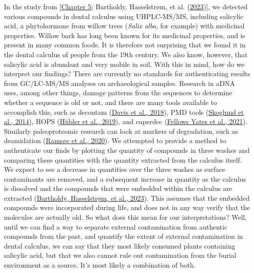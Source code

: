 \documentclass[
  letterpaper,
]{book}
\begin{document}
In the study from {[}\protect\hyperlink{mb11CalculusPilot}{Chapter 5};
Bartholdy, Hasselstrøm, et al.
(\protect\hyperlink{ref-bartholdyMultiproxyAnalysis2023}{2023}){]}, we
detected various compounds in dental calculus using UHPLC-MS/MS,
including salicylic acid, a phytohormone from willow trees (\emph{Salix
alba}, for example) with medicinal properties. Willow bark has long been
known for its medicinal properties, and is present in many common foods.
It is therefore not surprising that we found it in the dental calculus
of people from the 19th century. We also know, however, that salicylic
acid is abundant and very mobile in soil. With this in mind, how do we
interpret our findings? There are currently no standards for
authenticating results from GC/LC-MS/MS analyses on archaeological
samples. Research in aDNA uses, among other things, damage patterns from
the sequences to determine whether a sequence is old or not, and there
are many tools available to accomplish this, such as decontam
(\protect\hyperlink{ref-Rdecontam}{Davis et al., 2018}), PMD tools
(\protect\hyperlink{ref-skoglundSeparatingEndogenous2014}{Skoglund et
al., 2014}), HOPS
(\protect\hyperlink{ref-hublerHOPSAutomated2019}{Hübler et al., 2019}),
and cuperdec (\protect\hyperlink{ref-yatesOralMicrobiome2021}{Fellows
Yates et al., 2021}). Similarly paleoproteomic research can look at
markers of degradation, such as deamidation
(\protect\hyperlink{ref-ramsoeDeamiDATESitespecific2020}{Ramsøe et al.,
2020}). We attempted to provide a method to authenticate our finds by
plotting the quantity of compounds in three washes and comparing these
quantities with the quantity extracted from the calculus itself. We
expect to see a decrease in quantities over the three washes as surface
contaminants are removed, and a subsequent increase in quantity as the
calculus is dissolved and the compounds that were embedded within the
calculus are extracted
(\protect\hyperlink{ref-bartholdyMultiproxyAnalysis2023}{Bartholdy,
Hasselstrøm, et al., 2023}). This assumes that the embedded compounds
were incorporated during life, and does not in any way verify that the
molecules are actually old. So what does this mean for our
interpretations? Well, until we can find a way to separate external
contamination from authentic compounds from the past, and quantify the
extent of external contamination in dental calculus, we can say that
they most likely consumed plants containing salicylic acid, but that we
also cannot rule out contamination from the burial environment as a
source. It's most likely a combination of both.
\end{document}
